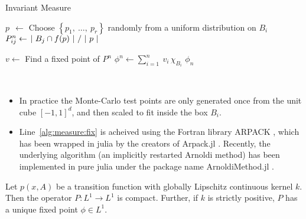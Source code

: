 \begin{algorithm}
    \caption{Invariant Measure}
    \label{alg:measure}
    \begin{spacing}{1.2}
        \begin{algorithmic}[1]

                \State $p\ \ \gets $ Choose $\left\{ p_1,\ \ldots,\ p_r \right\}$ randomly from a uniform distribution on $B_i$
                \State $P_{ij}^n \gets \left. |\ B_j \cap f(p)\ | \ \middle/\ |\ p\ | \right.$
            \EndFor
    
            \State $v \gets $ Find a fixed point of $P^n$
            \label{alg:measure:fix}
            \State $\phi^n \gets \sum_{i=1}^n\: v_i\, \chi_{B_i}$
            \State \Return $\phi_n$
        \end{algorithmic}
    \end{spacing}
\end{algorithm}

\begin{remark}\ 
    \begin{itemize}
        \item In practice the Monte-Carlo test points are only generated once from the unit cube 
        $[-1,1]^d$, and then scaled to fit inside the box $B_i$.
        \item Line~\ref{alg:measure:fix} is acheived using the Fortran library ARPACK \cite*{ARPACK}, 
        which has been wrapped in julia by the creators of Arpack.jl \cite*{Arpack.jl}. Recently, the 
        underlying algorithm (an implicitly restarted Arnoldi method) has been 
        implemented in pure julia under the package name ArnoldiMethod.jl \cite*{ArnoldiMethod.jl}. \\
    \end{itemize}
\end{remark}

\begin{proposition}
    \cite*{lasota}
    Let $p(x, A)$ be a transition function with globally Lipschitz continuous kernel $k$. 
    Then the operator $P : L^1 \to L^1$ is compact. Further, if $k$ is strictly positive, 
    $P$ has a unique fixed point $\phi \in L^1$. 
\end{proposition}


